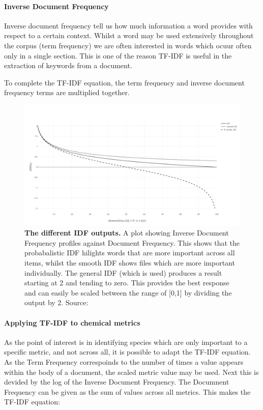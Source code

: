 \paragraph*{Inverse Document Frequency}
Inverse document frequency tell us how much information a word provides with respect to a certain context. Whilst a word may be used extensively throughout the corpus (term frequency) we are often interested in words which ocuur often only in a single section. This is one of the reason TF-IDF is useful in the extraction of keywords from a document. 


To complete the TF-IDF equation, the term frequency and inverse document frequency terms are multiplied together. 

\begin{figure}[H]
     \centering
         \includegraphics[width=\textwidth]{figures_c3/mlpregressor/plotidf.png}
        \caption{ \textbf{The different IDF outputs.} A plot showing Inverse Document Frequency profiles against Document Frequency. This shows that the probabalistic IDF hilights words that are more important across all items, whilst the smooth IDF shows files which are more important individually. The general IDF (which is used) produces a result starting at 2 and tending to zero. This provides the best response and can easily be scaled between the range of [0,1] by dividing the output by 2.  Source: \citep{idfpic}}
        \label{fig:idf}
\end{figure}


\paragraph*{Applying TF-IDF to chemical metrics}
As the point of interest is in identifying species which are only important to a specific metric, and not across all, it is possible to adapt the TF-IDF equation. As the Term Frequency correspoinds to the number of times a value appears within the body of a document, the scaled metric value may be used. Next this is devided by the log of the Inverse Document Frequency. The Documnent Frequency can be given as the sum of values across all metrics. This makes the TF-IDF equation: 

